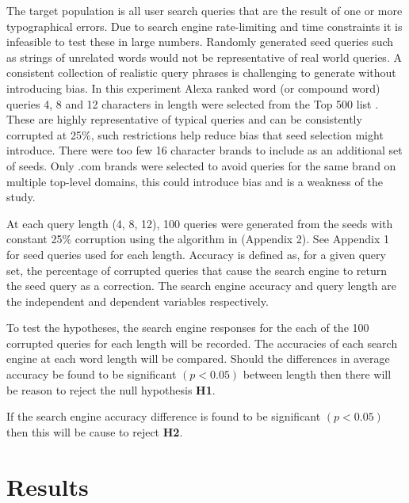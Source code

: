 \documentclass{csfourzero}
\begin{document}
The target population is all user search queries that are the result of one or more typographical errors. Due to search engine rate-limiting and time constraints it is infeasible to test these in large numbers. Randomly generated seed queries such as strings of unrelated words would not be representative of real world queries. A consistent collection of realistic query phrases is challenging to generate without introducing bias. In this experiment Alexa ranked word (or compound word) queries 4, 8 and 12 characters in length were selected from the Top 500 list \cite{alexatop500}. These are highly representative of typical queries and can be consistently corrupted at 25\%, such restrictions help reduce bias that seed selection might introduce. There were too few 16 character brands to include as an additional set of seeds. Only .com brands were selected to avoid queries for the same brand on multiple top-level domains, this could introduce bias and is a weakness of the study.

At each query length (4, 8, 12), 100 queries were generated from the seeds with constant 25\% corruption using the algorithm in (Appendix 2). See Appendix 1 for seed queries used for each length. Accuracy is defined as, for a given query set, the percentage of corrupted queries that cause the search engine to return the seed query as a correction. The search engine accuracy and query length are the independent and dependent variables respectively.

To test the hypotheses, the search engine responses for the each of the 100 corrupted queries for each length will be recorded. The accuracies of each search engine at each word length will be compared. Should the differences in average accuracy be found to be significant $(p < 0.05)$ between length then there will be reason to reject the null hypothesis \textbf{H1}.

If the search engine accuracy difference is found to be significant $(p < 0.05)$ then this will be cause to reject \textbf{H2}.

\section{Results}
\label{sec:results}
\end{document}
